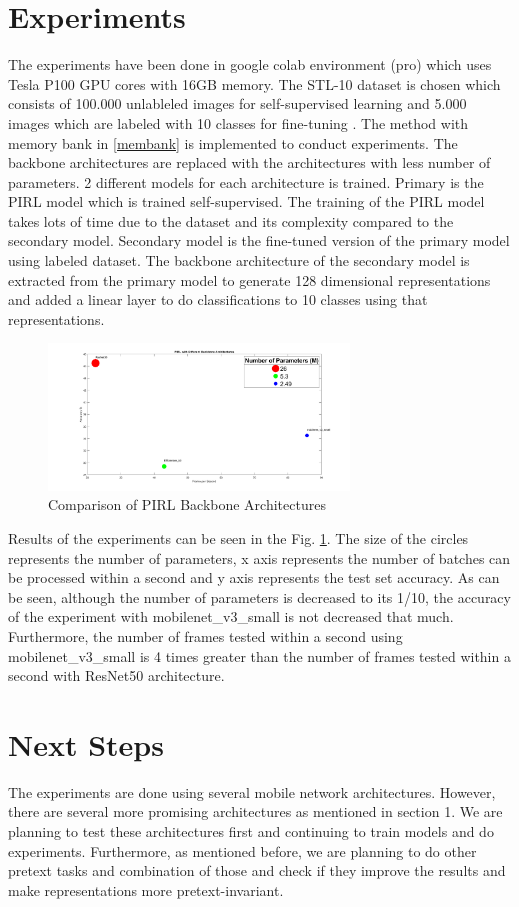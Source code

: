 \documentclass[conference]{IEEEtran}
\begin{document}
\section{Experiments}
The experiments have been done in google colab environment (pro) which uses Tesla P100 GPU cores with 16GB memory. The STL-10 dataset is chosen which consists of 100.000 unlableled images for self-supervised learning and 5.000 images which are labeled with 10 classes for fine-tuning \cite{stl10}. The method with memory bank in \ref{membank} is implemented to conduct experiments. The backbone architectures are replaced with the architectures with less number of parameters. 2 different models for each architecture is trained. Primary is the PIRL model which is trained self-supervised. The training of the PIRL model takes lots of time due to the dataset and its complexity compared to the secondary model. Secondary model is the fine-tuned version of the primary model using labeled dataset. The backbone architecture of the secondary model is extracted from the primary model to generate 128 dimensional representations and added a linear layer to do classifications to 10 classes using that representations.\\
\begin{figure}[h]
\centerline{\includegraphics[width=8cm]{results.png}}
\caption{Comparison of PIRL Backbone Architectures}
\label{fig_results}
\end{figure}
Results of the experiments can be seen in the Fig. \ref{fig_results}. The size of the circles represents the number of parameters, x axis represents the number of batches can be processed within a second and y axis represents the test set accuracy. As can be seen, although the number of parameters is decreased to its 1/10, the accuracy of the experiment with mobilenet\_v3\_small is not decreased that much. Furthermore, the number of frames tested within a second using mobilenet\_v3\_small is 4 times greater than the number of frames tested within a second with ResNet50 architecture.
\section{Next Steps}
The experiments are done using several mobile network architectures. However, there are several more promising architectures as mentioned in section 1. We are planning to test these architectures first and continuing to train models and do experiments. Furthermore, as mentioned before, we are planning to do other pretext tasks and combination of those and check if they improve the results and make representations more pretext-invariant.


\vspace{12pt}
\end{document}
